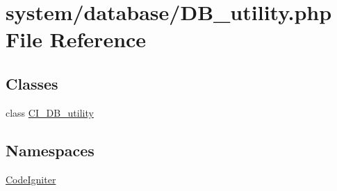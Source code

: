 \hypertarget{_d_b__utility_8php}{}\section{system/database/\+D\+B\+\_\+utility.php File Reference}
\label{_d_b__utility_8php}
\subsection*{Classes}
\begin{DoxyCompactItemize}
\item 
class \mbox{\hyperlink{class_c_i___d_b__utility}{C\+I\+\_\+\+D\+B\+\_\+utility}}
\end{DoxyCompactItemize}
\subsection*{Namespaces}
\begin{DoxyCompactItemize}
\item 
 \mbox{\hyperlink{namespace_code_igniter}{Code\+Igniter}}
\end{DoxyCompactItemize}
